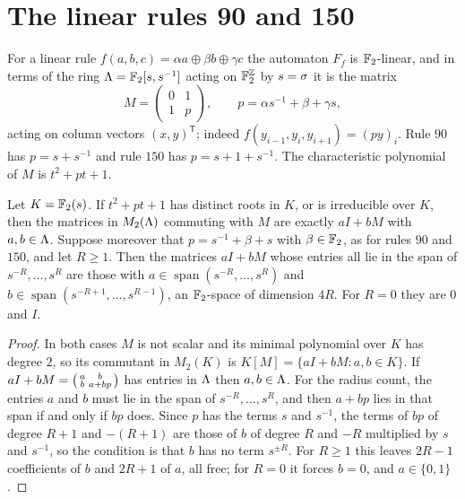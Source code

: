 \section{The linear rules 90 and 150}\label{sec:linear}

For a linear rule $f(a,b,c)=\alpha a\oplus\beta b\oplus\gamma c$ the automaton $F_f$ is $\mathbb{F}_2$-linear, and in terms of the ring $\Lambda=\mathbb{F}_2[s,s^{-1}]$ acting on $\mathbb{F}_2^{\mathbb{Z}}$ by $s=\sigma$ it is the matrix
\[
M=\begin{pmatrix}0&1\\1&p\end{pmatrix},\qquad p=\alpha s^{-1}+\beta+\gamma s,
\]
acting on column vectors $(x,y)^{\mathsf T}$; indeed $f(y_{i-1},y_i,y_{i+1})=(py)_i$. Rule $90$ has $p=s+s^{-1}$ and rule $150$ has $p=s+1+s^{-1}$. The characteristic polynomial of $M$ is $t^2+pt+1$.

\begin{lemma}\label{lem:commutant}
Let $K=\mathbb{F}_2(s)$. If $t^2+pt+1$ has distinct roots in $K$, or is irreducible over $K$, then the matrices in $M_2(\Lambda)$ commuting with $M$ are exactly $aI+bM$ with $a,b\in\Lambda$. Suppose moreover that $p=s^{-1}+\beta+s$ with $\beta\in\mathbb{F}_2$, as for rules $90$ and $150$, and let $R\ge1$. Then the matrices $aI+bM$ whose entries all lie in the span of $s^{-R},\dots,s^{R}$ are those with $a\in\operatorname{span}(s^{-R},\dots,s^R)$ and $b\in\operatorname{span}(s^{-R+1},\dots,s^{R-1})$, an $\mathbb{F}_2$-space of dimension $4R$. For $R=0$ they are $0$ and $I$.
\end{lemma}

\begin{proof}
In both cases $M$ is not scalar and its minimal polynomial over $K$ has degree $2$, so its commutant in $M_2(K)$ is $K[M]=\{aI+bM:a,b\in K\}$. If $aI+bM=\begin{psmallmatrix}a&b\\b&a+bp\end{psmallmatrix}$ has entries in $\Lambda$ then $a,b\in\Lambda$. For the radius count, the entries $a$ and $b$ must lie in the span of $s^{-R},\dots,s^R$, and then $a+bp$ lies in that span if and only if $bp$ does. Since $p$ has the terms $s$ and $s^{-1}$, the terms of $bp$ of degree $R+1$ and $-(R+1)$ are those of $b$ of degree $R$ and $-R$ multiplied by $s$ and $s^{-1}$, so the condition is that $b$ has no term $s^{\pm R}$. For $R\ge1$ this leaves $2R-1$ coefficients of $b$ and $2R+1$ of $a$, all free; for $R=0$ it forces $b=0$, and $a\in\{0,1\}$.
\end{proof}

